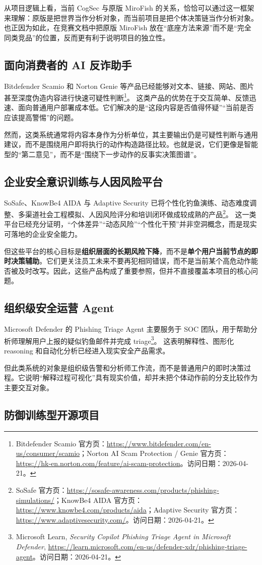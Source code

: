 \documentclass[12pt,a4paper]{ctexart}
\newcommand{\ResearchDate}{2026-04-21}
\newcommand{\SrcConsumerTools}{\footnote{Bitdefender Scamio 官方页：\url{https://www.bitdefender.com/en-us/consumer/scamio}；Norton AI Scam Protection / Genie 官方页：\url{https://hk-en.norton.com/feature/ai-scam-protection}。访问日期：\ResearchDate。}}
\newcommand{\SrcEnterprisePlatforms}{\footnote{SoSafe 官方页：\url{https://sosafe-awareness.com/products/phishing-simulations/}；KnowBe4 AIDA 官方页：\url{https://www.knowbe4.com/products/aida}；Adaptive Security 官方页：\url{https://www.adaptivesecurity.com/}。访问日期：\ResearchDate。}}
\newcommand{\SrcPhishingTriage}{\footnote{Microsoft Learn, \emph{Security Copilot Phishing Triage Agent in Microsoft Defender}, \url{https://learn.microsoft.com/en-us/defender-xdr/phishing-triage-agent}。访问日期：\ResearchDate。}}
\begin{document}
从项目逻辑上看，当前 CogSec 与原版 MiroFish 的关系，恰恰可以通过这一框架来理解：原版是把世界当作分析对象，而当前项目是把个体决策链当作分析对象。也正因为如此，在竞赛文档中把原版 MiroFish 放在“底座方法来源”而不是“完全同类竞品”的位置，反而更有利于说明项目的独立性。

\subsection{面向消费者的 AI 反诈助手}

Bitdefender Scamio 和 Norton Genie 等产品已经能够对文本、链接、网站、图片甚至深度伪造内容进行快速可疑性判断\SrcConsumerTools。 这类产品的优势在于交互简单、反馈迅速、面向普通用户部署成本低。它们解决的是“这段内容是否值得怀疑”“当前是否应该提高警惕”的问题。

然而，这类系统通常将内容本身作为分析单位，其主要输出仍是可疑性判断与通用建议，而不是围绕用户即将执行的动作构造路径比较。也就是说，它们更像是智能型的“第二意见”，而不是“围绕下一步动作的反事实决策图谱”。

\subsection{企业安全意识训练与人因风险平台}

SoSafe、KnowBe4 AIDA 与 Adaptive Security 已将个性化钓鱼演练、动态难度调整、多渠道社会工程模拟、人因风险评分和培训闭环做成较成熟的产品\SrcEnterprisePlatforms。 这一类平台已经充分证明，“个体差异”“动态风险”“个性化干预”并非空洞概念，而是现实可落地的企业安全能力。

但这些平台的核心目标是\textbf{组织层面的长期风险下降}，而不是\textbf{单个用户当前节点的即时决策辅助}。它们更关注员工未来不要再犯相同错误，而不是当前某个高危动作能否被及时改写。因此，这些产品构成了重要参照，但并不直接覆盖本项目的核心问题。

\subsection{组织级安全运营 Agent}

Microsoft Defender 的 Phishing Triage Agent 主要服务于 SOC 团队，用于帮助分析师理解用户上报的疑似钓鱼邮件并完成 triage\SrcPhishingTriage。 这表明解释性、图形化 reasoning 和自动化分析已经进入现实安全产品需求。

但此类系统的对象是组织级告警和分析师工作流，而不是普通用户的即时决策过程。它说明“解释过程可视化”具有现实价值，却并未把个体动作前的分支比较作为主要交互对象。

\subsection{防御训练型开源项目}
\end{document}
